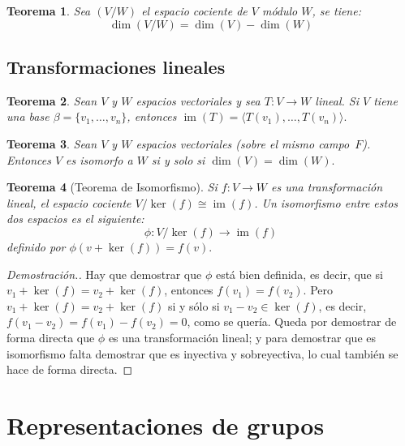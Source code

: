\documentclass[12pt]{book}
\newtheorem{theorem}{Teorema}[section]
\theoremstyle{definition}
\DeclareMathOperator{\im}{im}
\newcounter{in}
\newcounter{ini}
\begin{document}
\begin{theorem}
  \label{dim-esp-coc}
  Sea $(V/W)$ el espacio cociente de $V$ módulo $W$, se tiene:
  $$\dim(V/W)=\dim(V)-\dim(W)$$
\end{theorem}


\section{Transformaciones lineales}

\begin{theorem}
  \label{imT}
  Sean $V$ y $W$ espacios vectoriales y sea $T:V \rightarrow W$
  lineal. Si $V$ tiene una base $\beta=\{v_{1},\ldots,v_{n}\}$,
  entonces $\im(T)=\langle T(v_{1}),\ldots,T(v_{n})\rangle.$  
\end{theorem}

\begin{theorem}
  \label{esp-isomorfos}
  Sean $V$ y $W$ espacios vectoriales (sobre el mismo
  campo~$F$). Entonces $V$ es isomorfo a $W$ si y solo si $\dim
  (V)=\dim(W).$ 
\end{theorem}

\begin{theorem}[Teorema de Isomorfismo]
  \label{teorema-isomorfismo-esp}
  Si $f:V\rightarrow W$ es una transformación lineal, el espacio
  cociente $V/\ker(f)\cong \im(f)$. Un isomorfismo entre estos dos
  espacios es el siguiente:
  $$\phi:V/\ker(f)\rightarrow \im(f)$$
  definido por $\phi(v+\ker(f))=f(v).$
\end{theorem}
\begin{proof}[Demostración.]
  Hay que demostrar que $\phi$ está bien definida, es decir, que si
  $v_1+\ker(f)=v_2+\ker(f)$, entonces
  $f(v_1)=f(v_{2}).$ Pero
  $v_1+\ker(f)=v_2+\ker(f)$ si y sólo si
  $v_{1}-v_{2}\in \ker(f)$, es decir,
  $f(v_{1}-v_{2})=f(v_1)-f(v_2)=0$,
  como se quería. Queda por demostrar de forma directa que $\phi$ es
  una transformación lineal; y para demostrar que es isomorfismo falta
  demostrar que es inyectiva y sobreyectiva, lo cual también se hace
  de forma directa.
\end{proof}

\chapter{Representaciones de grupos}
\label{Representaciones de grupos}
\end{document}
